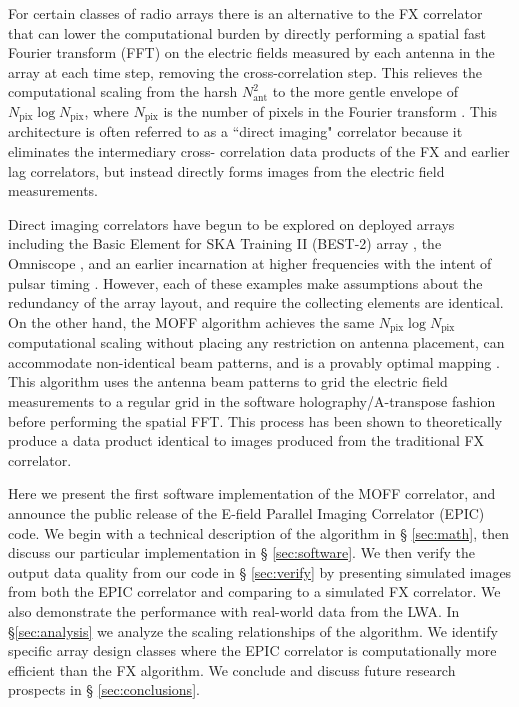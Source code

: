\documentclass[a4paper,fleqn,usenatbib]{../mnras}
\newcommand{\Nant}{N_{\text{ant}}}
\newcommand{\Npix}{N_{\text{pix}}}
\begin{document}
For certain classes of radio arrays there is an alternative to the FX correlator
that can lower the computational burden by directly performing a spatial fast
Fourier transform (FFT) on the electric fields measured by each antenna in the
array at each time step, removing the cross-correlation step. This relieves the
computational scaling from the harsh $\Nant^2$ to the more gentle envelope of
$\Npix\log\Npix$, where $\Npix$ is the number of pixels in the Fourier transform
\citep[e.g.][]{mor11,teg09,teg10}. This architecture is often referred to as a
``direct imaging" correlator because it eliminates the intermediary cross-
correlation data products of the FX and earlier lag correlators, but instead
directly forms images from the electric field measurements.

Direct imaging correlators have begun to be explored on deployed arrays including
the Basic Element for SKA Training II (BEST-2) array \citep{fos14}, the Omniscope
\citep{zhe14}, and an earlier incarnation at higher frequencies with the intent
of pulsar timing \citep{oto94, dai00}. However, each of these examples make
assumptions about the redundancy of the array layout, and require the collecting
elements are identical. On the other hand, the MOFF algorithm achieves the same
$\Npix \log \Npix$ computational scaling without placing any restriction on
antenna placement, can accommodate non-identical beam patterns, and is 
a provably optimal mapping \citep{mor11}. This algorithm uses the antenna beam 
patterns to grid the electric field measurements to a regular grid in the software
holography/A-transpose fashion \citep{mor09,bha08,teg97b} before performing the
spatial FFT. This process has been shown to theoretically produce a data product
identical to images produced from the traditional FX correlator.

Here we present the first software implementation of the MOFF correlator, and
announce the public release of the E-field Parallel Imaging Correlator (EPIC)
code. We begin with a technical description of the algorithm in \S
\ref{sec:math}, then discuss our particular implementation in \S
\ref{sec:software}. We then verify the output data quality from our code in \S
\ref{sec:verify} by presenting simulated images from both the EPIC correlator
and comparing to a simulated FX correlator. We also demonstrate the performance
with real-world data from the LWA. In \S \ref{sec:analysis} we analyze the
scaling relationships of the algorithm. We identify specific array design classes
where the EPIC correlator is computationally more efficient than the FX
algorithm. We conclude and discuss future research prospects in \S
\ref{sec:conclusions}.
\end{document}
